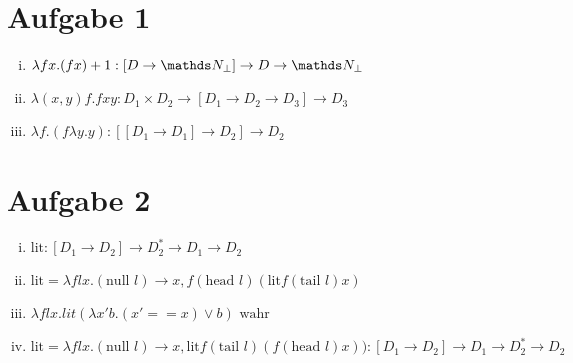 




\newcommand{\nr}{9}


\section*{Aufgabe 1}
\begin{enumerate}[(i)]
    \item $\lambda f x . (f x) + 1 : [D \to \N_\bot] \to D \to \N_\bot$
    \item $\lambda (x,y) f . f x y : D_1 \times D_2 \to [D_1 \to D_2 \to D_3] \to D_3$
    \item $\lambda f . (f \lambda y . y) : [ [ D_1 \to D_1 ] \to D_2 ] \to D_2 $
\end{enumerate}

\section*{Aufgabe 2}
\begin{enumerate}[(i)]
\item $\text{lit}: [D_1 \to D_2] \to D_2^{*} \to D_1 \to D_2$
\item $\text{lit} = \lambda f l x . (\text{null } l) \to x , f (\text{head } l) (\text{lit} f (\text{tail } l)  x) $
\item $\lambda f l x . lit (\lambda x' b. (x' == x) \lor b) \text{ wahr}$
\item $\text{lit} = \lambda f l x . (\text{null } l) \to x , \text{lit} f (\text{tail } l) (f (\text{head } l) x)) : [D_1 \to D_2] \to D_1 \to D_2^{*} \to D_2$
\end{enumerate}


